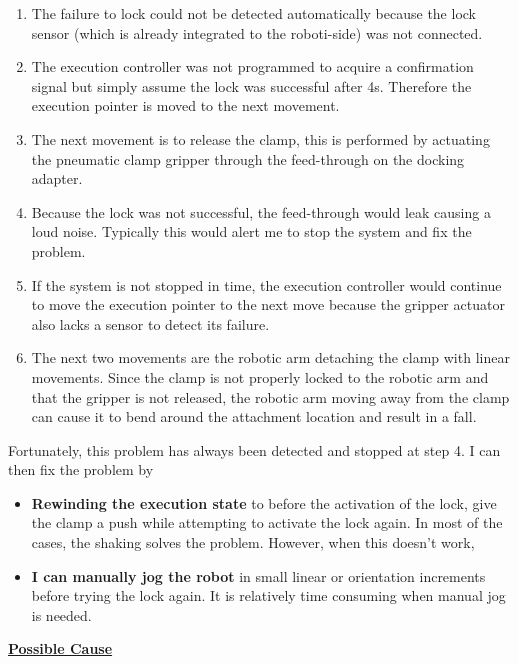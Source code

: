 \documentclass[11pt]{book}
\begin{document}
\begin{enumerate}
	\item The failure to lock could not be detected automatically because the lock sensor (which is already integrated to the roboti-side) was not connected.

	\item The execution controller was not programmed to acquire a confirmation signal but simply assume the lock was successful after 4s. Therefore the execution pointer is moved to the next movement.

	\item The next movement is to release the clamp, this is performed by actuating the pneumatic clamp gripper through the feed-through on the docking adapter.

	\item Because the lock was not successful, the feed-through would leak causing a loud noise. Typically this would alert me to stop the system and fix the problem.

	\item If the system is not stopped in time, the execution controller would continue to move the execution pointer to the next move because the gripper actuator also lacks a sensor to detect its failure.

	\item The next two movements are the robotic arm detaching the clamp with linear movements. Since the clamp is not properly locked to the robotic arm and that the gripper is not released, the robotic arm moving away from the clamp can cause it to bend around the attachment location and result in a fall. 

\end{enumerate}
Fortunately, this problem has always been detected and stopped at step 4. I can then fix the problem by 

\begin{itemize}
	\item \textbf{Rewinding the execution state }to before the activation of the lock, give the clamp a push while attempting to activate the lock again. In most of the cases, the shaking solves the problem. However, when this doesn’t work,

	\item \textbf{I can manually jog the robot} in small linear or orientation increments before trying the lock again. It is relatively time consuming when manual jog is needed.

\end{itemize}
\textbf{\uline{Possible Cause}}
\end{document}
